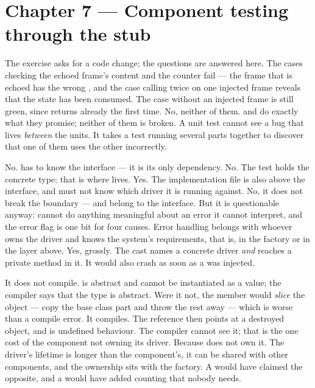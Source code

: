 \section*{Chapter 7 --- Component testing through the stub}

The exercise asks for a code change; the questions are answered here.
 The cases checking the echoed frame's content and the counter fail --- the frame that is
echoed has the wrong , and the case calling  twice on one injected frame
reveals that the state has been consumed. The case without an injected frame is still green, since
 returns  already the first time.
 No, neither of them.  and  do exactly what they promise; neither of
them is broken.
 A unit test cannot see a bug that lives \emph{between} the units. It takes a test running
several parts together to discover that one of them uses the other incorrectly.

 No.  has to know the interface --- it is its only dependency.
 No. The test holds the concrete type; that is where  lives.
 Yes. The implementation file is also above the interface, and must not know which driver
it is running against.
 No, it does not break the boundary ---  and  belong to
the interface. But it is questionable anyway:  cannot do anything meaningful about
an error it cannot interpret, and the error flag is one bit for four causes. Error handling
belongs with whoever owns the driver and knows the system's requirements, that is, in the factory
or in the layer above.
 Yes, grossly. The cast names a concrete driver \emph{and} reaches a private method in it.
It would also crash as soon as a  was injected.

 It does not compile.  is abstract and cannot be instantiated as a value;
the compiler says that the type is abstract. Were it not, the member would \emph{slice} the object
--- copy the base class part and throw the rest away --- which is worse than a compile error.
 It compiles. The reference then points at a destroyed object, and  is
undefined behaviour. The compiler cannot see it; that is the one cost of the component not owning
its driver.
 Because  does not own it. The driver's lifetime is longer than the
component's, it can be shared with other components, and the ownership sits with the factory. A
 would have claimed the opposite, and a  would have added
counting that nobody needs.

